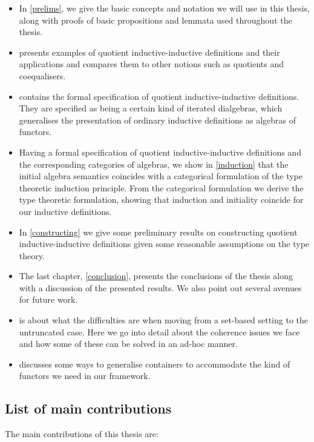 \begin{itemize}
\item In \cref{prelims}, we give the basic concepts and notation we
  will use in this thesis, along with proofs of basic propositions and
  lemmata used throughout the thesis.
\item {} presents examples of quotient inductive-inductive
  definitions and their applications and compares them to other
  notions such as quotients and coequalisers.
\item {} contains the formal specification of quotient
  inductive-inductive definitions. They are specified as being a
  certain kind of iterated dialgebras, which generalises the
  presentation of ordinary inductive definitions as algebras of
  functors.
\item Having a formal specification of quotient inductive-inductive
  definitions and the corresponding categories of algebras, we show in
  \cref{induction} that the initial algebra semantics coincides with a
  categorical formulation of the type theoretic induction
  principle. From the categorical formulation we derive the type
  theoretic formulation, showing that induction and initiality
  coincide for our inductive definitions.
\item In \cref{constructing} we give some preliminary results on
  constructing quotient inductive-inductive definitions given some
  reasonable assumptions on the type theory.
\item The last chapter, \cref{conclusion}, presents the conclusions of
  the thesis along with a discussion of the presented results. We also
  point out several avenues for future work.
\item {} is about what the difficulties are when
  moving from a set-based setting to the untruncated case. Here we go
  into detail about the coherence issues we face and how some of these
  can be solved in an ad-hoc manner.
\item {} discusses some ways to generalise containers
  to accommodate the kind of functors we need in our framework.
\end{itemize}

\subsection{List of main contributions}

The main contributions of this thesis are:

